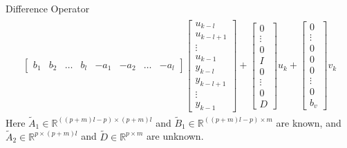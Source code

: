 \documentclass[aspectratio=169, handout, 10pt, hyperref=colorlinks]{beamer}
\begin{document}
\begin{frame}[allowframebreaks]{Difference Operator}
\begin{align}
\begin{split}
\begin{bmatrix}
        b_1 & b_2 & \dots & b_l & -a_1 & -a_2 & \dots &  -a_l 
        \end{bmatrix}  
        \begin{bmatrix} u_{k-l} \\ u_{k-l+1} \\ \vdots \\ u_{k-1} \\ y_{k-l} \\ y_{k-l+1} \\ \vdots \\ y_{k-1}  \end{bmatrix} + 
        \begin{bmatrix} 
        0 \\ \vdots \\ 0 \\ I \\ 0 \\ \vdots \\ 0 \\ D  \end{bmatrix} 
        u_{k} + \begin{bmatrix} 0 \\ \vdots \\ 0 \\ 0 \\ 0 \\ \vdots \\ 0 \\  b_v \end{bmatrix} v_{k} 
        \end{split} 
        \end{align}
        Here $\tilde{A}_1 \in \mathbb{R}^{((p+m)l-p) \times (p+m)l}$ and $\widetilde{B}_1 \in \mathbb{R}^{((p+m)l-p) \times m}$ are known, and $\tilde{A}_2 \in \mathbb{R}^{p \times (p+m)l}$ and $\widetilde{D} \in \mathbb{R}^{p \times m}$ are unknown. 
\end{frame}
\end{document}
